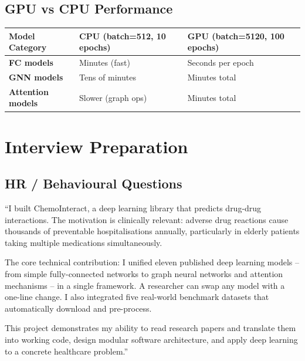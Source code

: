 \documentclass[12pt,a4paper,oneside]{book}
\begin{document}
\section{GPU vs CPU Performance}

\begin{longtable}{>{\bfseries}p{3.5cm}p{5.5cm}p{5cm}}
\toprule
Model Category & CPU (batch=512, 10 epochs) & GPU (batch=5120, 100 epochs) \\
\midrule\endhead
FC models & Minutes (fast) & Seconds per epoch \\
GNN models & Tens of minutes & Minutes total \\
Attention models & Slower (graph ops) & Minutes total \\
\bottomrule
\end{longtable}

\chapter{Interview Preparation}\label{chap:interview}

\section{HR / Behavioural Questions}

\begin{tcolorbox}[questionbox,title={Q1: Tell me about your final year project.}]
\end{tcolorbox}
\begin{tcolorbox}[answerbox]
``I built ChemoInteract, a deep learning library that predicts drug-drug interactions. The motivation is clinically relevant: adverse drug reactions cause thousands of preventable hospitalisations annually, particularly in elderly patients taking multiple medications simultaneously.

The core technical contribution: I unified eleven published deep learning models -- from simple fully-connected networks to graph neural networks and attention mechanisms -- in a single framework. A researcher can swap any model with a one-line change. I also integrated five real-world benchmark datasets that automatically download and pre-process.

This project demonstrates my ability to read research papers and translate them into working code, design modular software architecture, and apply deep learning to a concrete healthcare problem.''
\end{tcolorbox}
\end{document}
